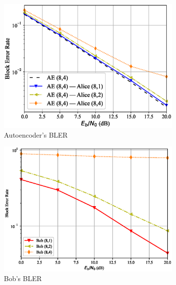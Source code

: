 \begin{figure}
	\begin{subfigure}{0.3\textwidth}
		\includegraphics[width=\linewidth]{figs/covert_autoencoder_bler_rayleigh}
		\caption{Autoencoder's BLER}
		\label{fig:rayleigh_resutls_ae}
	\end{subfigure}
	\hspace*{\fill}
	\begin{subfigure}{0.3\textwidth}
		\includegraphics[width=\linewidth]{figs/bob_bler_rayleigh}
		\caption{Bob's BLER}
		\label{fig:rayleigh_resutls_bob}	
	\end{subfigure}
	\hspace*{\fill}
	\begin{subfigure}{0.3\textwidth}

\end{subfigure}
\end{figure}
